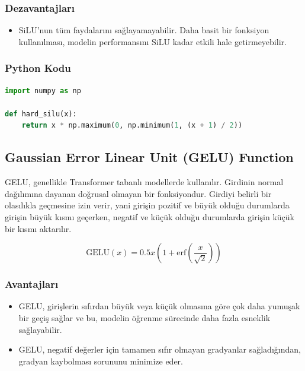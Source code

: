 \subsubsection{Dezavantajları}

\begin{itemize}
    \item SiLU’nun tüm faydalarını sağlayamayabilir. Daha basit bir fonksiyon kullanılması, modelin performansını SiLU kadar etkili hale getirmeyebilir.
\end{itemize}

\subsubsection{Python Kodu}

\begin{lstlisting}[language=Python]
import numpy as np

def hard_silu(x):
    return x * np.maximum(0, np.minimum(1, (x + 1) / 2))
\end{lstlisting}

\newpage

\subsection{Gaussian Error Linear Unit (GELU) Function}

GELU, genellikle Transformer tabanlı modellerde kullanılır. Girdinin normal dağılımına dayanan doğrusal olmayan bir fonksiyondur. Girdiyi belirli bir olasılıkla geçmesine izin verir, yani girişin pozitif ve büyük olduğu durumlarda girişin büyük kısmı geçerken, negatif ve küçük olduğu durumlarda girişin küçük bir kısmı aktarılır. 

\[ \text{GELU}(x) = 0.5 x \left( 1 + \text{erf}\left( \frac{x}{\sqrt{2}} \right) \right) \]

\subsubsection{Avantajları}

\begin{itemize}
    \item GELU, girişlerin sıfırdan büyük veya küçük olmasına göre çok daha yumuşak bir geçiş sağlar ve bu, modelin öğrenme sürecinde daha fazla esneklik sağlayabilir.
    \item GELU, negatif değerler için tamamen sıfır olmayan gradyanlar sağladığından, gradyan kaybolması sorununu minimize eder.
\end{itemize}

